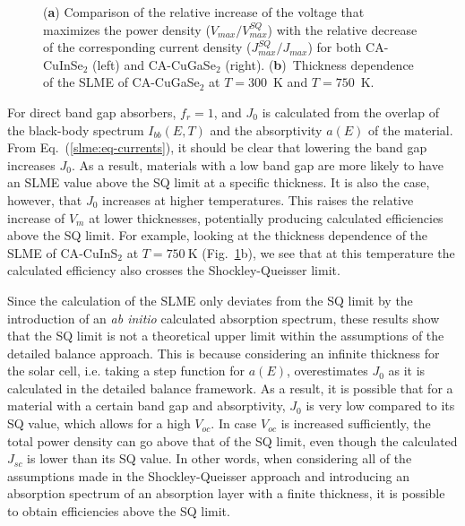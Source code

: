 \begin{refsection}
\begin{figure}[ht] 
\captionsetup{width=0.9\textwidth}
\centering 

\caption{(\textbf{\textsf{a}}) Comparison of the relative increase of the voltage that maximizes the power density ($V_{max}/V_{max}^{SQ}$) with the relative decrease of the corresponding current density ($J_{max}^{SQ}/J_{max}$) for both \gls{CA}-CuInSe$_2$ (left) and \gls{CA}-CuGaSe$_2$ (right). (\textbf{\textsf{b}})~Thickness dependence of the \gls{SLME} of \gls{CA}-CuGaSe$_2$ at $T = 300$~\si{\kelvin} and $T = 750$~\si{\kelvin}.} 
\label{slme:fig-ratios_highT} 
\end{figure}

For direct band gap absorbers, $f_r = 1$, and $J_0$ is calculated from the 
overlap of the black-body spectrum $I_{bb}(E,T)$ and the absorptivity $a(E)$ 
of the material. From Eq.~(\ref{slme:eq-currents}), it should be clear that 
lowering the band gap increases $J_0$. As a result, materials with a low band 
gap are more likely to have an \gls{SLME} value above the \gls{SQ} limit at a specific 
thickness. It is also the case, however, that $J_0$ increases at higher 
temperatures. This raises the relative increase of $V_m$ at lower 
thicknesses, potentially producing calculated efficiencies above the \gls{SQ} limit. 
For example, looking at the thickness dependence of the \gls{SLME} of \gls{CA}-CuInS$_2$ 
at $T=750~\si{\kelvin}$ (Fig.~\ref{slme:fig-ratios_highT}b), we see that at this 
temperature the calculated efficiency also crosses the Shockley-Queisser 
limit.
 
Since the calculation of the \gls{SLME} only deviates from the \gls{SQ} limit by the 
introduction of an \textit{ab initio} calculated absorption spectrum, these 
results show that the \gls{SQ} limit is not a theoretical upper limit within the 
assumptions of the detailed balance approach. This is because considering an 
infinite thickness for the solar cell, i.e. taking a step function for $a(E)$, 
overestimates $J_0$ as it is calculated in the detailed balance framework. As 
a result, it is possible that for a material with a certain band gap and 
absorptivity, $J_0$ is very low compared to its \gls{SQ} value, which allows for a 
high $V_{oc}$. In case $V_{oc}$ is increased sufficiently, the total power 
density can go above that of the \gls{SQ} limit, even though the calculated $J_{sc}$ 
is lower than its \gls{SQ} value. In other words, when considering all of the 
assumptions made in the Shockley-Queisser approach and introducing an absorption 
spectrum of an absorption layer with a finite thickness, it is possible to 
obtain efficiencies above the \gls{SQ} limit. 
 

\end{refsection}
